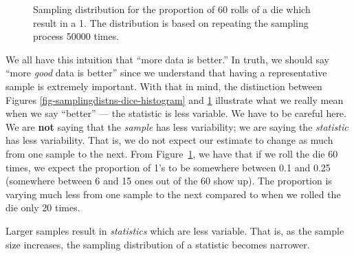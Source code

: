 \documentclass[
  letterpaper,
  DIV=11,
  numbers=noendperiod]{scrreprt}
\theoremstyle{definition}
\theoremstyle{definition}
\theoremstyle{plain}
\theoremstyle{remark}
\begin{document}
\begin{figure}


\caption{\label{fig-samplingdistns-dice-histogram2}Sampling distribution
for the proportion of 60 rolls of a die which result in a 1. The
distribution is based on repeating the sampling process 50000 times.}

\end{figure}%

We all have this intuition that ``more data is better.'' In truth, we
should say ``more \emph{good} data is better'' since we understand that
having a representative sample is extremely important. With that in
mind, the distinction between Figures
\ref{fig-samplingdistns-dice-histogram} and
\ref{fig-samplingdistns-dice-histogram2} illustrate what we really mean
when we say ``better'' --- the statistic is less variable. We have to be
careful here. We are \textbf{not} saying that the \emph{sample} has less
variability; we are saying the \emph{statistic} has less variability.
That is, we do not expect our estimate to change as much from one sample
to the next. From Figure~\ref{fig-samplingdistns-dice-histogram2}, we
have that if we roll the die 60 times, we expect the proportion of 1's
to be somewhere between 0.1 and 0.25 (somewhere between 6 and 15 ones
out of the 60 show up). The proportion is varying much less from one
sample to the next compared to when we rolled the die only 20 times.

\begin{tcolorbox}[enhanced jigsaw, colbacktitle=quarto-callout-tip-color!10!white, colback=white, left=2mm, title=\textcolor{quarto-callout-tip-color}{\faLightbulb}\hspace{0.5em}{Big Idea}, toptitle=1mm, leftrule=.75mm, breakable, bottomrule=.15mm, arc=.35mm, rightrule=.15mm, toprule=.15mm, coltitle=black, opacityback=0, colframe=quarto-callout-tip-color-frame, opacitybacktitle=0.6, bottomtitle=1mm, titlerule=0mm]

Larger samples result in \emph{statistics} which are less variable. That
is, as the sample size increases, the sampling distribution of a
statistic becomes narrower.

\end{tcolorbox}
\end{document}
